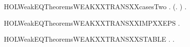 \newcommand{\HOLWeakEQTheoremsWEAKXXTRANSXXcasesOne}{\UseVerbatim{HOLWeakEQTheoremsWEAKXXTRANSXXcasesOne}}
\begin{SaveVerbatim}{HOLWeakEQTheoremsWEAKXXTRANSXXcasesTwo}
\HOLTokenTurnstile{} \HOLSymConst{\HOLTokenForall{}}  .
        \HOLTokenWeakTransBegin{} \HOLTokenWeakTransEnd {} \HOLSymConst{\HOLTokenImp{}}
       (\HOLSymConst{\HOLTokenExists{}}.  \HOLTokenTransBegin\HOLConst{\ensuremath{\tau}}\HOLTokenTransEnd {} \HOLSymConst{\HOLTokenConj{}}  \HOLTokenWeakTransBegin{} \HOLTokenWeakTransEnd {}) \HOLSymConst{\HOLTokenDisj{}}
       \HOLSymConst{\HOLTokenExists{}}.  \HOLTokenTransBegin{} \HOLTokenTransEnd {} \HOLSymConst{\HOLTokenConj{}}   
\end{SaveVerbatim}
\newcommand{\HOLWeakEQTheoremsWEAKXXTRANSXXcasesTwo}{\UseVerbatim{HOLWeakEQTheoremsWEAKXXTRANSXXcasesTwo}}
\begin{SaveVerbatim}{HOLWeakEQTheoremsWEAKXXTRANSXXIMPXXEPS}
\HOLTokenTurnstile{} \HOLSymConst{\HOLTokenForall{}} .  \HOLTokenWeakTransBegin\HOLConst{\ensuremath{\tau}}\HOLTokenWeakTransEnd {} \HOLSymConst{\HOLTokenImp{}}   
\end{SaveVerbatim}
\newcommand{\HOLWeakEQTheoremsWEAKXXTRANSXXIMPXXEPS}{\UseVerbatim{HOLWeakEQTheoremsWEAKXXTRANSXXIMPXXEPS}}
\begin{SaveVerbatim}{HOLWeakEQTheoremsWEAKXXTRANSXXSTABLE}
\HOLTokenTurnstile{} \HOLSymConst{\HOLTokenForall{}}  .
        \HOLTokenWeakTransBegin{} \HOLTokenWeakTransEnd {} \HOLSymConst{\HOLTokenConj{}}   \HOLSymConst{\HOLTokenImp{}}
       \HOLSymConst{\HOLTokenExists{}}.  \HOLTokenTransBegin{} \HOLTokenTransEnd {} \HOLSymConst{\HOLTokenConj{}}   
\end{SaveVerbatim}
